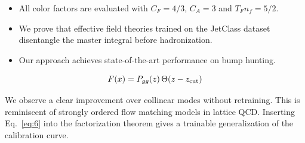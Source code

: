 \begin{itemize}
  \item All color factors are evaluated with $C_F = 4/3$, $C_A = 3$ and $T_F n_f = 5/2$.
  \item We prove that effective field theories trained on the JetClass dataset disentangle the master integral before hadronization.
  \item Our approach achieves state-of-the-art performance on bump hunting.
\end{itemize}

\begin{equation}
  F(x) = P_{gg}(z) \, \Theta(z - z_{\rm cut})
  \label{eq:9}
\end{equation}

We observe a clear improvement over collinear modes without retraining.
This is reminiscent of strongly ordered flow matching models in lattice
QCD. Inserting Eq.~\eqref{eq:6} into the factorization theorem gives a
trainable generalization of the calibration curve.

